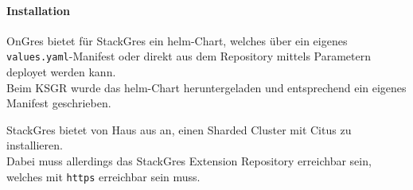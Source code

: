 \begin{flushleft}
    \paragraph{Installation}
    OnGres bietet für StackGres ein \gls{helm}-Chart, welches über ein eigenes \texttt{values.yaml}-Manifest oder direkt aus dem Repository mittels Parametern deployet werden kann.\\
    Beim KSGR wurde das \gls{helm}-Chart heruntergeladen und entsprechend ein eigenes Manifest geschrieben.
\end{flushleft}
\begin{flushleft}
    StackGres bietet von Haus aus an, einen Sharded Cluster mit Citus zu installieren.\\
    Dabei muss allerdings das StackGres Extension Repository erreichbar sein, welches mit \texttt{https} erreichbar sein muss.
\end{flushleft}
